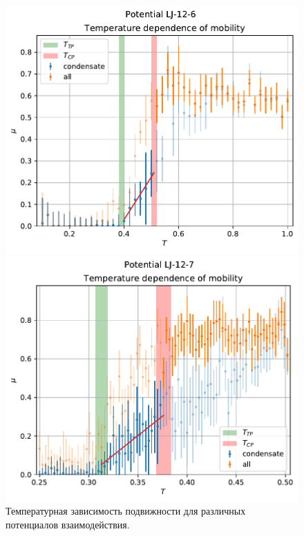 \documentclass[pdf,hyperref={unicode}]{beamer}
\begin{document}
\begin{frame}
\begin{figure}[h]
\begin{center}
\begin{minipage}[h]{0.35\linewidth}
\end{minipage}
\begin{minipage}[h]{0.35\linewidth}
\includegraphics[width=\textwidth, keepaspectratio]{plot_mobility_Potential LJ-12-6_1}
\end{minipage}
\begin{minipage}[h]{0.35\linewidth}
\includegraphics[width=\textwidth, keepaspectratio]{plot_mobility_Potential LJ-12-7_1}
\end{minipage}
\caption{\tiny Температурная зависимость подвижности для различных потенциалов взаимодействия.}
\label{risMuDiff}
\end{center}
\end{figure}

\end{frame}
\end{document}
